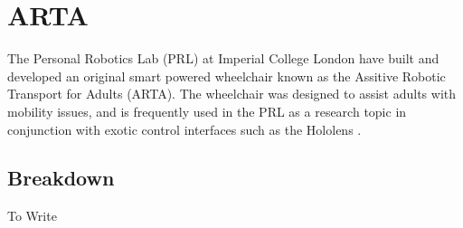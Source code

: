 \section{ARTA}
The Personal Robotics Lab (PRL) at Imperial College London have built and developed an original smart powered wheelchair known as the Assitive Robotic Transport for Adults (ARTA). The wheelchair was designed to assist adults with mobility issues, and is frequently used in the PRL as a research topic in conjunction with exotic control interfaces such as the Hololens \cite{Zolotas2018, Chacon-Quesada}.

\subsection{Breakdown}

To Write
